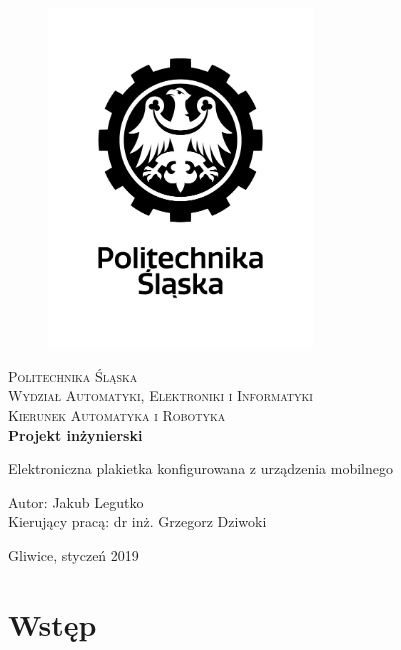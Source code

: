 \documentclass[a4paper,12pt, twoside]{article}
\begin{document}
	\newpage
	\thispagestyle{empty}
	\begin{center}
		
		\begin{figure}
			\centering
			\includegraphics[width=7cm]{images/polsl_logo.jpg}
			\vspace{.5cm}
		\end{figure}
		
		{\fontsize{17}{17}\selectfont
			\textsc{Politechnika Śląska \\[.3cm]
				Wydział Automatyki, Elektroniki i Informatyki  \\[.3cm]
				Kierunek Automatyka i Robotyka  \\[1.5cm]}
			\textbf{Projekt inżynierski \\[0.7cm]}}
		
		\Large
		{Elektroniczna plakietka konfigurowana z urządzenia mobilnego \\[3.5cm]}
		\Large{\begin{flushleft}
				Autor: Jakub Legutko\\
				Kierujący pracą: dr inż. Grzegorz Dziwoki\\[0.3cm]
		\end{flushleft}}
		
		\normalsize
		\vfill Gliwice, styczeń 2019
	\end{center}
	\newpage
	\newpage
	\thispagestyle{empty}
	\tableofcontents
	\newpage
	\newpage
	\clearpage
	\setcounter{page}{1}
	
	\section{Wstęp}
	
\end{document}
